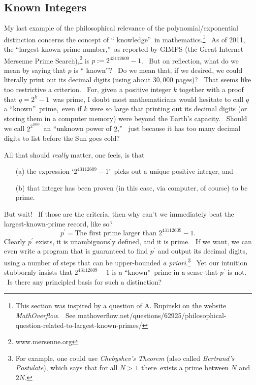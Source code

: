 \documentclass[11pt,onecolumn]{article}%
\begin{document}
\subsection{Known Integers\label{INTEGERS}}

My last example of the philosophical relevance of the polynomial/exponential
distinction concerns the concept of \textquotedblleft
knowledge\textquotedblright\ in mathematics.\footnote{This section was
inspired by a question of A. Rupinski on the website \textit{MathOverflow}.
\ See
mathoverflow.net/questions/62925/philosophical-question-related-to-largest-known-primes/}
\ As of 2011, the \textquotedblleft largest known prime
number,\textquotedblright\ as reported by GIMPS (the Great Internet Mersenne
Prime Search),\footnote{www.mersenne.org} is $p:=2^{43112609}-1$. \ But on
reflection, what do we mean by saying that $p$ is \textquotedblleft
known\textquotedblright? \ Do we mean that, if we desired, we could literally
print out its decimal digits (using about $30,000$ pages)? \ That seems like
too restrictive a criterion. \ For, given a positive integer $k$ together with
a proof that $q=2^{k}-1$\ was prime, I doubt most mathematicians would
hesitate to call $q$ a \textquotedblleft known\textquotedblright\ prime,\ even
if $k$ were so large that printing out its decimal digits (or storing them in
a computer memory) were beyond the Earth's capacity. \ Should we call
$2^{2^{1000}}$\ an \textquotedblleft unknown power of $2$,\textquotedblright%
\ just because it has too many decimal digits to list before the Sun goes cold?

All that should \textit{really} matter, one feels, is that

\begin{enumerate}
\item[(a)] the expression `$2^{43112609}-1$'\ picks out a unique positive
integer, and

\item[(b)] that integer has been proven (in this case, via computer, of
course) to be prime.
\end{enumerate}

But wait! \ If those are the criteria, then why can't we immediately beat the
largest-known-prime record, like so?%
\[
p^{\prime}=\text{The first prime larger than }2^{43112609}-1.
\]
Clearly $p^{\prime}$ exists, it is unambiguously defined, and it is prime.
\ If we want, we can even write a program that is guaranteed to find
$p^{\prime}$ and output its decimal digits, using a number of steps that can
be upper-bounded \textit{a priori}.\footnote{For example, one could use
\textit{Chebyshev's Theorem} (also called \textit{Bertrand's Postulate}),
which says that for all $N>1$\ there\ exists a prime between $N$ and $2N$.}
\ Yet our intuition stubbornly insists that $2^{43112609}-1$ is a
\textquotedblleft known\textquotedblright\ prime in a sense that $p^{\prime}$
is not. \ Is there any principled basis for such a distinction?
\end{document}
